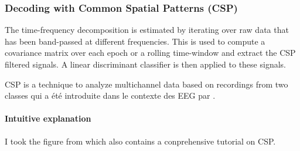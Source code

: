 \subsubsection{Decoding with Common Spatial Patterns (CSP)}

The time-frequency decomposition is estimated by iterating over raw data that has been band-passed at different frequencies. This is used to compute a
covariance matrix over each epoch or a rolling time-window and extract the CSP
filtered signals. A linear discriminant classifier is then applied to these
signals.

CSP is a technique to analyze multichannel data based on recordings from two classes qui a été introduite dans le contexte des EEG par \cite{koles1990spatial}.



\paragraph{Intuitive explanation}


I took the figure from \cite{blankertz2007optimizing} which also contains a conprehensive tutorial on CSP.

